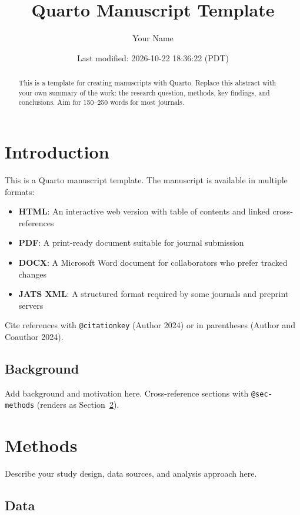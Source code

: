 \documentclass[
  letterpaper,
  DIV=11,
  numbers=noendperiod]{scrartcl}
\title{Quarto Manuscript Template}
\author{Your Name}
\date{Last modified: 2026-10-22 18:36:22 (PDT)}
\providecommand{\tightlist}{%
  \setlength{\itemsep}{0pt}\setlength{\parskip}{0pt}}
\begin{document}
\maketitle
\begin{abstract}
This is a template for creating manuscripts with Quarto. Replace this
abstract with your own summary of the work: the research question,
methods, key findings, and conclusions. Aim for 150--250 words for most
journals.
\end{abstract}


\section{Introduction}\label{sec-intro}

This is a Quarto manuscript template. The manuscript is available in
multiple formats:

\begin{itemize}
\tightlist
\item
  \textbf{HTML}: An interactive web version with table of contents and
  linked cross-references
\item
  \textbf{PDF}: A print-ready document suitable for journal submission
\item
  \textbf{DOCX}: A Microsoft Word document for collaborators who prefer
  tracked changes
\item
  \textbf{JATS XML}: A structured format required by some journals and
  preprint servers
\end{itemize}

Cite references with \texttt{@citationkey} (Author 2024) or in
parentheses (Author and Coauthor 2024).

\subsection{Background}\label{background}

Add background and motivation here. Cross-reference sections with
\texttt{@sec-methods} (renders as Section~\ref{sec-methods}).

\section{Methods}\label{sec-methods}

Describe your study design, data sources, and analysis approach here.

\subsection{Data}\label{data}
\end{document}
